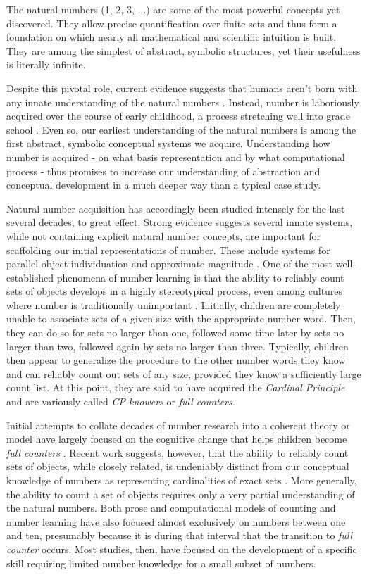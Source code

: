 \documentclass[10pt,letterpaper]{article}
\begin{document}
The natural numbers (1, 2, 3, $\ldots$) are some of the most powerful
concepts yet discovered. They allow precise quantification over finite
sets and thus form a foundation on which nearly all mathematical and
scientific intuition is built. They are among the simplest of
abstract, symbolic structures, yet their usefulness is literally
infinite.

Despite this pivotal role, current evidence suggests that humans
aren't born with any innate understanding of the natural numbers
\citep{Car2009}. Instead, number is laboriously acquired over the
course of early childhood, a process stretching well into grade school
\citep{Nat2010}. Even so, our earliest understanding of the natural
numbers is among the first abstract, symbolic conceptual systems we
acquire. Understanding how number is acquired - on what basis
representation and by what computational process - thus promises to
increase our understanding of abstraction and conceptual development
in a much deeper way than a typical case study.

Natural number acquisition has accordingly been studied intensely for
the last several decades, to great effect. Strong evidence suggests
several innate systems, while not containing explicit natural number
concepts, are important for scaffolding our initial representations of
number. These include systems for parallel object individuation and
approximate magnitude \citep{feigenson2004core}. One of the most
well-established phenomena of number learning is that the ability to
reliably count sets of objects develops in a highly stereotypical
process, even among cultures where number is traditionally unimportant
\citep{Wyn1992,JarPianSpelEtAl2014}. Initially, children are
completely unable to associate sets of a given size with the
appropriate number word. Then, they can do so for sets no larger than
one, followed some time later by sets no larger than two, followed
again by sets no larger than three. Typically, children then appear to
generalize the procedure to the other number words they know and can
reliably count out sets of any size, provided they know a sufficiently
large count list. At this point, they are said to have acquired the
\emph{Cardinal Principle} and are variously called \emph{CP-knowers}
or \emph{full counters}.

Initial attempts to collate decades of number research into a coherent
theory or model have largely focused on the cognitive change that
helps children become \emph{full counters}
\citep{Car2009,PianGoodTen2012}. Recent work suggests, however, that
the ability to reliably count sets of objects, while closely related,
is undeniably distinct from our conceptual knowledge of numbers as
representing cardinalities of exact sets
\citep{DavEngBar2012,izard2014toward,JarPianSpelEtAl2014}. More
generally, the ability to count a set of objects requires only a very
partial understanding of the natural numbers. Both prose and
computational models of counting and number learning have also focused
almost exclusively on numbers between one and ten, presumably because
it is during that interval that the transition to \emph{full counter}
occurs. Most studies, then, have focused on the development of a
specific skill requiring limited number knowledge for a small subset
of numbers.
\end{document}
